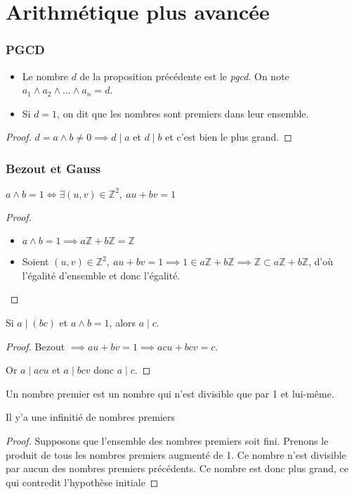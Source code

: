 \documentclass[french]{beamer}
\newcommand{\Z}{\mathbb{Z}}
\begin{document}
\section{Arithmétique plus avancée}

\begin{frame}
  \frametitle{PGCD}
  \begin{definition}
    \begin{itemize}
      \item Le nombre $d$ de la proposition précédente est le
        \emph{pgcd}. On note $a_1 \wedge a_2 \wedge … \wedge a_n = d$.
      \item Si $d=1$, on dit que les nombres sont premiers dans leur
        ensemble.
    \end{itemize}
  \end{definition}
  \begin{proof}
    $d=a\wedge b \neq 0 \implies d\mid a$ et $d\mid b$ et c'est bien le
    plus grand.
  \end{proof}
\end{frame}

\begin{frame}
  \frametitle{Bezout et Gauss}
  \begin{theorem}[Bezout]
    $a\wedge b = 1 \iff \exists (u,v)\in\Z^2,\ au+bv = 1$
  \end{theorem}
  \begin{proof}
    \begin{itemize}
      \item $a\wedge b = 1 \implies a\Z + b\Z = \Z$
      \item Soient $(u,v)\in\Z^2,\ au+bv = 1 \implies 1\in a\Z + b\Z
        \implies \Z\subset a\Z + b\Z$, d'où l'égalité d'ensemble et donc
        l'égalité.
    \end{itemize}
  \end{proof}
  \begin{theorem}[Gauss]
    Si $a\mid(bc)$ et $a\wedge b = 1$, alors $a\mid c$.
  \end{theorem}
  \begin{proof}
    Bezout $\implies au + bv = 1 \implies acu + bcv = c$.

    Or $a\mid acu$ et $a\mid bcv$ donc $a\mid c$.
  \end{proof}
\end{frame}


\begin{frame}
  \begin{definition}
    Un nombre premier est un nombre qui n'est divisible que par 1 et
    lui-même.
  \end{definition}
  \begin{theorem}
    Il y'a une infinitié de nombres premiers
  \end{theorem}
  \begin{proof}
    Supposons que l'ensemble des nombres premiers soit fini. Prenons le
    produit de tous les nombres premiers augmenté de 1. Ce nombre n'est
    divisible par aucun des nombres premiers précédents. Ce nombre est
    donc plus grand, ce qui contredit l'hypothèse initiale
  \end{proof}
\end{frame}
\end{document}
